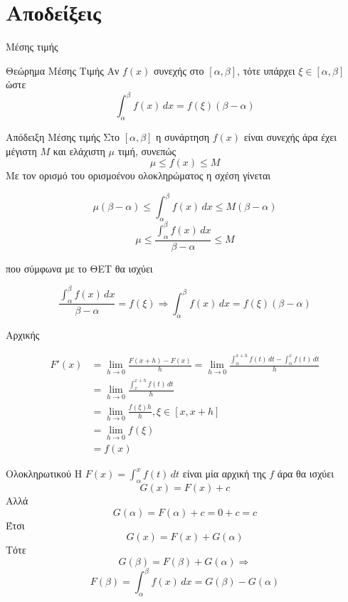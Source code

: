 \documentclass{presentation}
\begin{document}
\appendix
\section{Αποδείξεις}
\begin{frame}{Μέσης τιμής}
  \begin{block}{Θεώρημα Μέσης Τιμής}
    Αν $f(x)$ συνεχής στο $[α,β]$, τότε υπάρχει $ξ\in [α,β]$ ώστε
    $$\int_α^βf(x)\, dx=f(ξ)(β-α)$$
  \end{block}
\end{frame}

\begin{frame}{Απόδειξη Μέσης τιμής}
  Στο $[α,β]$ η συνάρτηση $f(x)$ είναι συνεχής άρα έχει μέγιστη $Μ$ και ελάχιστη $μ$ τιμή, συνεπώς
  $$μ\le f(x) \le Μ$$
  Με τον ορισμό του ορισμοένου ολοκληρώματος η σχέση γίνεται

  $$μ(β-α)\le \int_α^βf(x)\, dx \le Μ(β-α)$$
  $$μ\le \frac{\int_α^βf(x)\, dx}{β-α} \le Μ$$

  που σύμφωνα με το ΘΕΤ θα ισχύει

  $$\frac{\int_α^βf(x)\, dx}{β-α}=f(ξ)\Rightarrow \int_α^βf(x)\, dx=f(ξ)(β-α)$$

\end{frame}

\begin{frame}{Αρχικής}

  \begin{align*}
    F'(x) & =\lim_{h\to 0}\frac{F(x+h)-F(x)}{h}=\lim_{h\to 0}\frac{\int_α^{x+h} f(t) \, dt-\int_α^x f(t) \, dt}{h} \\
          & =\lim_{h\to 0}\frac{\int_x^{x+h} f(t) \, dt}{h}                                                        \\
          & = \lim_{h\to 0}\frac{f(ξ)h}{h},ξ\in[x,x+h]                                                             \\
          & = \lim_{h\to 0}f(ξ)                                                                                    \\
          & =f(x)
  \end{align*}

\end{frame}

\begin{frame}{Ολοκληρωτικού}
  Η $F(x)=\int_α^x f(t) \, dt$ είναι μία αρχική της $f$ άρα θα ισχύει
  $$G(x)=F(x)+c$$
  Αλλά $$G(α)=F(α)+c=0+c=c$$
  Έτσι $$G(x)=F(x)+G(α)$$
  Τότε $$G(β)=F(β)+G(α)\Rightarrow$$
  $$ F(β)=\int_α^β f(x) \, dx=G(β)-G(α)$$
\end{frame}
\end{document}
